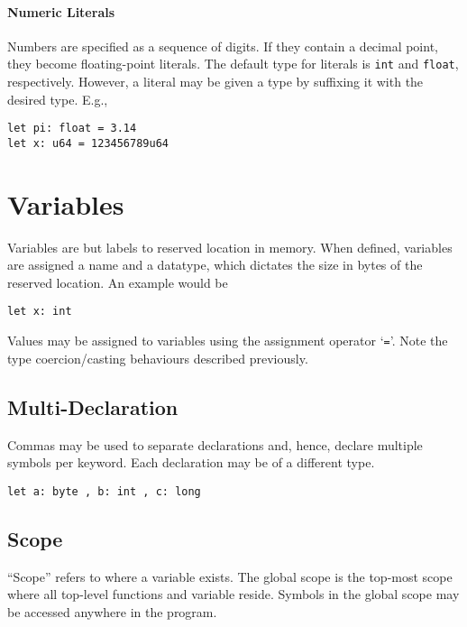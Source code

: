 \documentclass{article}
\begin{document}
\paragraph*{Numeric Literals}
Numbers are specified as a sequence of digits.
If they contain a decimal point, they become floating-point literals.
The default type for literals is \texttt{int} and \texttt{float}, respectively.
However, a literal may be given a type by suffixing it with the desired type.
E.g.,
\begin{lstlisting}[language=CustomLang]
let pi: float = 3.14
let x: u64 = 123456789u64
\end{lstlisting}

\section{Variables}

Variables are but labels to reserved location in memory.
When defined, variables are assigned a name and a datatype, which dictates the size in bytes of the reserved location.
An example would be

\begin{lstlisting}[language=CustomLang]
let x: int
\end{lstlisting}

Values may be assigned to variables using the assignment operator `\texttt{=}'.
Note the type coercion/casting behaviours described previously.

\subsection{Multi-Declaration}

Commas may be used to separate declarations and, hence, declare multiple symbols per keyword.
Each declaration may be of a different type.

\begin{lstlisting}[language=CustomLang]
let a: byte , b: int , c: long
\end{lstlisting}

\subsection{Scope}

``Scope'' refers to where a variable exists.
The global scope is the top-most scope where all top-level functions and variable reside.
Symbols in the global scope may be accessed anywhere in the program.
\end{document}
